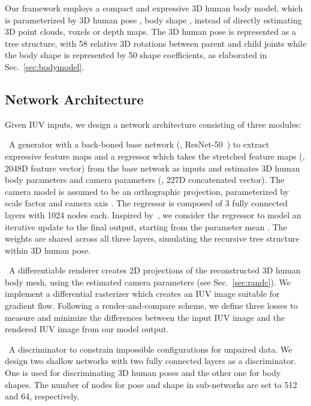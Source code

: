 \documentclass[10pt,twocolumn,letterpaper]{article}
\newcommand{\beforesubsection}{\vspace{0mm}}
\newcommand{\aftersubsection}{\vspace{0mm}}
\begin{document}
Our framework employs a compact and expressive 3D human body model, which is parameterized by 3D human pose , body shape , instead of directly estimating 3D point clouds, voxels or depth maps. The 3D human pose is represented as a tree structure, with 58 relative 3D rotations between parent and child joints while the body shape is represented by 50 shape coefficients, as elaborated in Sec.~\ref{sec:bodymodel}.

\beforesubsection
\subsection{Network Architecture} \label{sec:network}
\aftersubsection

Given IUV inputs, we design a network architecture consisting of three modules:

\noindent {\small \textbullet} \, A generator with a back-boned base network (\ie, ResNet-50~\cite{he2016deep}) to extract expressive feature maps and a regressor which takes the stretched feature maps (\ie, 2048D feature vector) from the base network as inputs and estimates 3D human body parameters  and camera parameters  (\ie, 227D concatenated vector). The camera model is assumed to be an orthographic projection, parameterized by scale factor  and camera axis . 
The regressor is composed of 3 fully connected layers with 1024 nodes each. Inspired by~\cite{kanazawa2018hmr}, we consider the regressor to model an iterative update  to the final output, starting from the parameter mean . The weights are shared across all three layers, simulating the recursive tree structure within 3D human pose.

\noindent {\small \textbullet} \, A differentiable renderer creates 2D projections of the reconstructed 3D human body mesh, using the estimated camera parameters (see Sec.~\ref{sec:randc}). We implement a differential rasterizer which creates an IUV image suitable for gradient flow. Following a render-and-compare scheme, we define three losses to measure and minimize the differences between the input IUV image and the rendered IUV image from our model output.

\noindent {\small \textbullet} \, A discriminator to constrain impossible configurations for unpaired data. We design two shallow networks with two fully connected layers as a discriminator. One is used for discriminating 3D human poses and the other one for body shapes. The number of nodes for pose and shape in sub-networks are set to 512 and 64, respectively. 
\end{document}

